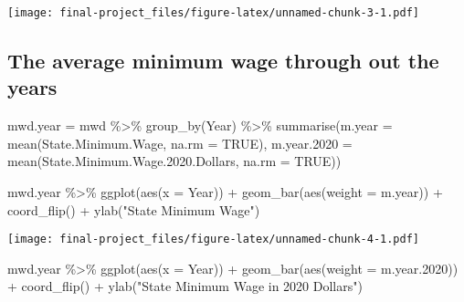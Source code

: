 \documentclass[
]{article}
\newenvironment{Shaded}{\begin{snugshade}}{\end{snugshade}}
\newcommand{\AttributeTok}[1]{\textcolor[rgb]{0.77,0.63,0.00}{#1}}
\newcommand{\ConstantTok}[1]{\textcolor[rgb]{0.00,0.00,0.00}{#1}}
\newcommand{\FloatTok}[1]{\textcolor[rgb]{0.00,0.00,0.81}{#1}}
\newcommand{\FunctionTok}[1]{\textcolor[rgb]{0.00,0.00,0.00}{#1}}
\newcommand{\NormalTok}[1]{#1}
\newcommand{\OtherTok}[1]{\textcolor[rgb]{0.56,0.35,0.01}{#1}}
\newcommand{\SpecialCharTok}[1]{\textcolor[rgb]{0.00,0.00,0.00}{#1}}
\newcommand{\StringTok}[1]{\textcolor[rgb]{0.31,0.60,0.02}{#1}}
\begin{document}
\texttt{[image: final-project\_files/figure-latex/unnamed-chunk-3-1.pdf]}

\hypertarget{the-average-minimum-wage-through-out-the-years}{%
\subsection{The average minimum wage through out the
years}\label{the-average-minimum-wage-through-out-the-years}}

\begin{Shaded}
\begin{Highlighting}[]
\NormalTok{mwd.year }\OtherTok{=}\NormalTok{ mwd }\SpecialCharTok{\%\textgreater{}\%} \FunctionTok{group\_by}\NormalTok{(Year) }\SpecialCharTok{\%\textgreater{}\%} 
  \FunctionTok{summarise}\NormalTok{(}\AttributeTok{m.year =} \FunctionTok{mean}\NormalTok{(State.Minimum.Wage, }\AttributeTok{na.rm =} \ConstantTok{TRUE}\NormalTok{), }
            \AttributeTok{m.year.2020 =} \FunctionTok{mean}\NormalTok{(State.Minimum.Wage.}\FloatTok{2020.}\NormalTok{Dollars, }\AttributeTok{na.rm =} \ConstantTok{TRUE}\NormalTok{))}

\NormalTok{mwd.year }\SpecialCharTok{\%\textgreater{}\%} \FunctionTok{ggplot}\NormalTok{(}\FunctionTok{aes}\NormalTok{(}\AttributeTok{x =}\NormalTok{ Year)) }\SpecialCharTok{+} 
  \FunctionTok{geom\_bar}\NormalTok{(}\FunctionTok{aes}\NormalTok{(}\AttributeTok{weight =}\NormalTok{ m.year)) }\SpecialCharTok{+} 
  \FunctionTok{coord\_flip}\NormalTok{() }\SpecialCharTok{+} 
  \FunctionTok{ylab}\NormalTok{(}\StringTok{"State Minimum Wage"}\NormalTok{)}
\end{Highlighting}
\end{Shaded}

\texttt{[image: final-project\_files/figure-latex/unnamed-chunk-4-1.pdf]}

\begin{Shaded}
\begin{Highlighting}[]
\NormalTok{mwd.year }\SpecialCharTok{\%\textgreater{}\%} \FunctionTok{ggplot}\NormalTok{(}\FunctionTok{aes}\NormalTok{(}\AttributeTok{x =}\NormalTok{ Year)) }\SpecialCharTok{+} 
  \FunctionTok{geom\_bar}\NormalTok{(}\FunctionTok{aes}\NormalTok{(}\AttributeTok{weight =}\NormalTok{ m.year}\FloatTok{.2020}\NormalTok{)) }\SpecialCharTok{+} 
  \FunctionTok{coord\_flip}\NormalTok{() }\SpecialCharTok{+} 
  \FunctionTok{ylab}\NormalTok{(}\StringTok{"State Minimum Wage in 2020 Dollars"}\NormalTok{)}
\end{Highlighting}
\end{Shaded}
\end{document}
